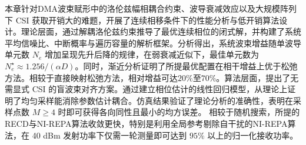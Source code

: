 本章针对DMA波束赋形中的洛伦兹幅相耦合约束、波导衰减效应以及大规模阵列下 CSI 获取开销大的难题，开展了连续相移条件下的性能分析与低开销算法设计。理论层面，通过解耦洛伦兹约束推导了最优连续相位的闭式解，并构建了系统平均信噪比、中断概率与遍历容量的解析框架。分析得出，系统波束增益随单波导单元数 $N_e$ 增加呈现先升后降的规律，在弱衰减近似下，最佳单元数为 $N_e^\star \approx 1.256/(\alpha D)$。同时，渐近分析证明了所提最优配置在相干增益上优于松弛方法。相较于直接映射松弛方法，相对增益可达$20\%$至$70\%$。算法层面，提出了无需显式 CSI 的盲波束对齐方案。通过建立相位估计的线性回归模型，从理论上证明了均匀采样能消除参数估计耦合。仿真结果验证了理论分析的准确性，表明在采样点数 $M \ge 4$ 时即可获得各向同性且最小的均方误差。
相较于随机搜索，所提的RECD与NI-REPA算法收敛更快，特别是利用全局参考剔除自干扰的NI-REPA算法，在 40 dBm 发射功率下仅需一轮测量即可达到  $95\%$ 以上的归一化接收功率。
